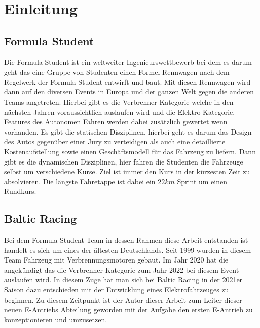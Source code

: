 


\chapter{Einleitung}

\section{Formula Student}
Die Formula Student ist ein weltweiter Ingenieurswettbewerb bei dem es darum geht das eine Gruppe von Studenten einen Formel Rennwagen nach dem Regelwerk der Formula Student entwirft und baut. Mit diesen Rennwagen wird dann auf den diversen Events in Europa und der ganzen Welt gegen die anderen Teams angetreten. Hierbei gibt es die Verbrenner Kategorie welche in den nächsten Jahren voraussichtlich auslaufen wird und die Elektro Kategorie. Features des Autonomen Fahren werden dabei zusätzlich gewertet wenn vorhanden. Es gibt die statischen Disziplinen, hierbei geht es darum das Design des Autos gegenüber einer Jury zu verteidigen als auch eine detaillierte Kostenaufstellung sowie einen Geschäftsmodell für das Fahrzeug zu liefern. Dann gibt es die dynamischen Disziplinen, hier fahren die Studenten die Fahrzeuge selbst um verschiedene Kurse. Ziel ist immer den Kurs in der kürzesten Zeit zu absolvieren. Die längste Fahretappe ist dabei ein \ensuremath{22 km} Sprint um einen Rundkurs.

\section{Baltic Racing}
Bei dem Formula Student Team in dessen Rahmen diese Arbeit entstanden ist handelt es sich um eines der ältesten Deutschlands. Seit 1999 wurden in diesem Team Fahrzeug mit Verbrennungsmotoren gebaut. Im Jahr 2020 hat die  angekündigt das die Verbrenner Kategorie zum Jahr 2022 bei diesem Event auslaufen wird. In diesem Zuge hat man sich bei Baltic Racing in der 2021er Saison dazu entschieden mit der Entwicklung eines Elektrofahrzeuges zu beginnen. Zu diesem Zeitpunkt ist der Autor dieser Arbeit zum Leiter dieser neuen E-Antriebs Abteilung geworden mit der Aufgabe den ersten E-Antrieb zu konzeptionieren und umzusetzen.

